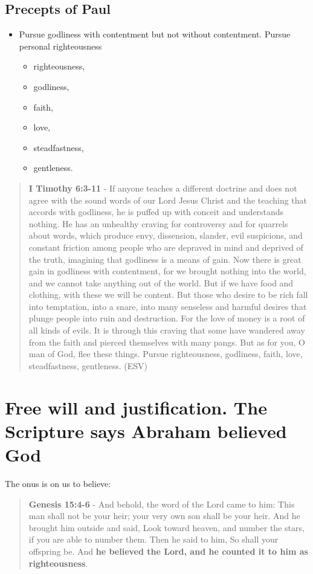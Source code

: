 \documentclass[11pt]{article}
\begin{document}
\subsection{Precepts of Paul}
\label{sec:orga547534}
\begin{itemize}
\item Pursue godliness with contentment but not without contentment. Pursue personal righteousness
\begin{itemize}
\item righteousness,
\item godliness,
\item faith,
\item love,
\item steadfastness,
\item gentleness.
\end{itemize}
\end{itemize}

\begin{quote}
\textbf{I Timothy 6:3-11} - If anyone teaches a different doctrine and does not agree with the sound words of our Lord Jesus Christ and the teaching that accords with godliness, he is puffed up with conceit and understands nothing. He has an unhealthy craving for controversy and for quarrels about words, which produce envy, dissension, slander, evil suspicions, and constant friction among people who are depraved in mind and deprived of the truth, imagining that godliness is a means of gain.  Now there is great gain in godliness with contentment, for we brought nothing into the world, and we cannot take anything out of the world.  But if we have food and clothing, with these we will be content.  But those who desire to be rich fall into temptation, into a snare, into many senseless and harmful desires that plunge people into ruin and destruction.  For the love of money is a root of all kinds of evils. It is through this craving that some have wandered away from the faith and pierced themselves with many pangs.  But as for you, O man of God, flee these things. Pursue righteousness, godliness, faith, love, steadfastness, gentleness. (ESV)
\end{quote}

\section{Free will and justification. The Scripture says \textbf{Abraham} believed God}
\label{sec:org9e86112}
The onus is on us to believe:

\begin{quote}
\textbf{Genesis 15:4-6} - And behold, the word of the Lord came to him: This man shall not be your heir; your very own son shall be your heir. And he brought him outside and said, Look toward heaven, and number the stars, if you are able to number them. Then he said to him, So shall your offspring be. And \textbf{he believed the Lord, and he counted it to him as righteousness}.
\end{quote}
\end{document}
